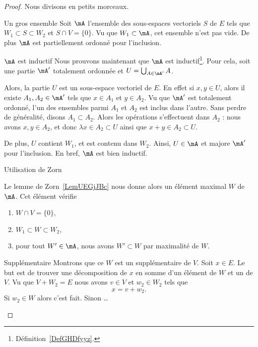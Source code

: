 \begin{proof}
	Nous divisons en petits morceaux.
	\begin{subproof}
		\item[Un gros ensemble]
		Soit \( \mA\) l'ensemble des sous-espaces vectoriels \( S\) de \( E\) tels que \( W_1\subset S\subset W_2\) et \( S\cap V=\{ 0 \}\). Vu que \( W_1\subset \mA\), cet ensemble n'est pas vide. De plus \( \mA\) est partiellement ordonné pour l'inclusion.
		\item[\( \mA\) est inductif]
		Nous prouvons maintenant que \( \mA\) est inductif\footnote{Définition~\ref{DefGHDfyyz}.}. Pour cela, soit une partie \( \mA'\) totalement ordonnée et \( U=\bigcup_{A\in \mA'}A\).

		Alors, la partie \( U\) est un sous-espace vectoriel de \( E\). En effet si \( x,y\in U\), alors il existe \( A_1,A_2\in\mA'\) tels que \( x\in A_1\) et \( y\in A_2\). Vu que \( \mA'\) est totalement ordonné, l'un des ensembles parmi \( A_1\) et \( A_2\) est inclus dans l'autre. Sans perdre de généralité, disons \( A_1\subset A_2\). Alors les opérations s'effectuent dans \( A_2 \) : nous avons \( x,y\in A_2\), et donc \( \lambda x\in A_2\subset U\) ainsi que \( x+y\in A_2\subset U\).

		De plus, \( U \) contient \( W_1 \), et est contenu dans \( W_2\). Ainsi, \( U\in \mA\) et majore \( \mA'\) pour l'inclusion. En bref, \( \mA\) est bien inductif.
		\item[Utilisation de Zorn]

		Le lemme de Zorn~\ref{LemUEGjJBc} nous donne alors un élément maximal \( W\) de \( \mA\). Cet élément vérifie
		\begin{enumerate}
			\item
			      \( W\cap V=\{ 0 \}\),
			\item
			      \( W_1\subset W\subset W_2\),
			\item
			      pour tout \( W'\in\mA\), nous avons \( W'\subset W\) par maximalité de \( W\).
		\end{enumerate}
		\item[Supplémentaire]
		Montrons que ce \( W\) est un supplémentaire de \( V\). Soit \( x\in E\). Le but est de trouver une décomposition de \( x\) en somme d'un élément de \( W\) et un de \( V\). Vu que \( V+W_2=E\) nous avons \( v\in V\) et \( w_2\in W_2\) tels que
		\begin{equation}
			x=v+w_2.
		\end{equation}
		Si \( w_2\in W\) alors c'est fait. Sinon \ldots


\end{subproof}
\end{proof}
